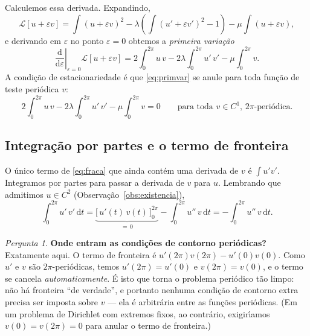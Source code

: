 \documentclass[11pt,a4paper]{amsart}
\renewcommand{\d}{\mathrm{d}}
\theoremstyle{plain}
\theoremstyle{definition}
\theoremstyle{remark}
\newtheorem{pergunta}[teorema]{Pergunta}
\begin{document}
Calculemos essa derivada. Expandindo,
\[
  \mathcal{L}[u+\varepsilon v]
  = \int (u+\varepsilon v)^2
    - \lambda\!\left(\int (u'+\varepsilon v')^2 - 1\right)
    - \mu\int (u+\varepsilon v),
\]
e derivando em $\varepsilon$ no ponto $\varepsilon=0$ obtemos a
\emph{primeira varia\c{c}\~ao}
\begin{equation}\label{eq:primvar}
  \left.\frac{\d}{\d\varepsilon}\right|_{\varepsilon=0}\!\!\mathcal{L}[u+\varepsilon v]
  = 2\int_0^{2\pi} u\,v
    - 2\lambda\int_0^{2\pi} u'\,v'
    - \mu\int_0^{2\pi} v .
\end{equation}
A condi\c{c}\~ao de estacionariedade \'e que \eqref{eq:primvar} se anule para
toda fun\c{c}\~ao de teste peri\'odica $v$:
\begin{equation}\label{eq:fraca}
  2\int_0^{2\pi} u\,v
  - 2\lambda\int_0^{2\pi} u'\,v'
  - \mu\int_0^{2\pi} v = 0
  \qquad\text{para toda $v\in C^1$, $2\pi$-peri\'odica.}
\end{equation}

\subsection{Integra\c{c}\~ao por partes e o termo de fronteira}

O \'unico termo de \eqref{eq:fraca} que ainda cont\'em uma derivada de $v$ \'e
$\int u'v'$. Integramos por partes para passar a derivada de $v$ para $u$.
Lembrando que admitimos $u\in C^2$ (Observa\c{c}\~ao~\ref{obs:existencia}),
\begin{equation}\label{eq:partes}
  \int_0^{2\pi} u'\,v' \,\d t
  = \underbrace{\big[\,u'(t)\,v(t)\,\big]_0^{2\pi}}_{=\,0}
    - \int_0^{2\pi} u''\,v \,\d t
  = - \int_0^{2\pi} u''\,v \,\d t .
\end{equation}

\begin{pergunta}\label{perg:fronteira}
\textbf{Onde entram as condi\c{c}\~oes de contorno peri\'odicas?}
Exatamente aqui. O termo de fronteira \'e
$u'(2\pi)v(2\pi) - u'(0)v(0)$. Como $u'$ e $v$ s\~ao $2\pi$-peri\'odicas,
temos $u'(2\pi)=u'(0)$ e $v(2\pi)=v(0)$, e o termo se cancela
\emph{automaticamente}. \'E isto que torna o problema peri\'odico t\~ao limpo:
n\~ao h\'a fronteira ``de verdade'', e portanto nenhuma condi\c{c}\~ao de
contorno extra precisa ser imposta sobre $v$ --- ela \'e arbitr\'aria entre as
fun\c{c}\~oes peri\'odicas. (Em um problema de Dirichlet com extremos fixos,
ao contr\'ario, exigir\'\i amos $v(0)=v(2\pi)=0$ para anular o termo de
fronteira.)
\end{pergunta}
\end{document}
